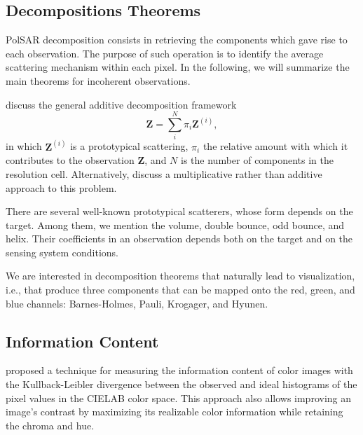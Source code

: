 \documentclass{article}
\begin{document}
    \subsection{Decompositions Theorems}
    
    PolSAR decomposition consists in retrieving the components which gave rise to each observation.
    The purpose of such operation is to identify the average scattering mechanism within each pixel.
    In the following, we will summarize the main theorems for incoherent observations.
    
    \citet{ModelingandInterpretationofScatteringMechanismsinPolarimetricSyntheticApertureRadarAdvancesandPerspectives2014} discuss the general additive decomposition framework
    \begin{equation}
    \bm Z = \sum_i^N \pi_i \bm Z^{(i)},
    \end{equation}
    in which $\bm Z^{(i)}$ is a prototypical scattering, 
    $\pi_i$ the relative amount with which it contributes to the observation $\bm Z$, and $N$ is the number of components in the resolution cell.
    Alternatively, \citet{APolSARScatteringPowerFactorizationFrameworkandNovelRollInvariantParametersBasedUnsupervisedClassificationSchemeUsingaGeodesicDistanceinpress} discuss a multiplicative rather than additive approach to this problem.
    
    There are several well-known prototypical scatterers, whose form depends on the target.
    Among them, we mention the volume, double bounce, odd bounce, and helix.
    Their coefficients in an observation depends both on the target and on the sensing system conditions.
    
    We are interested in decomposition theorems that naturally lead to visualization, i.e., that produce three components that can be mapped onto the red, green, and blue channels: Barnes-Holmes, Pauli, Krogager, and Hyunen.
    
    \subsection{Information Content}
    
    \citet{AssessingInformationContentinColorImages} proposed a technique for measuring the information content of color images with the Kullback-Leibler divergence between the observed and ideal histograms of the pixel values in the CIELAB color space.
    This approach also allows improving an image's contrast by maximizing its realizable color information while retaining the chroma and hue.
    
\end{document}
